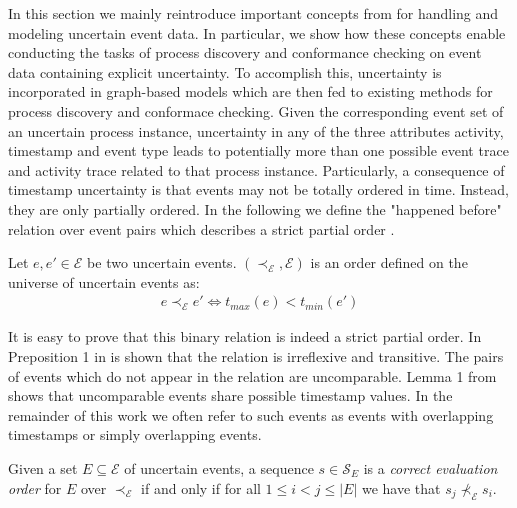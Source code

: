 In this section we mainly reintroduce important concepts from \citep{mining,discovery,efficient} for handling and modeling uncertain event data.
In particular, we show how these concepts enable conducting the tasks of process discovery and conformance checking on event data containing explicit uncertainty.
To accomplish this, uncertainty is incorporated in graph-based models which are then fed to existing methods for process discovery and conformace checking.
Given the corresponding event set of an uncertain process instance, uncertainty in any of the three attributes activity, timestamp and event type leads to potentially more than one possible event trace and activity trace related to that process instance.
Particularly, a consequence of timestamp uncertainty is that events may not be totally ordered in time.
Instead, they are only partially ordered.
In the following we define the "happened before" relation over event pairs which describes a strict partial order \cite{conformance}. 

\begin{definition}
Let $e, e' \in \mathcal{E}$ be two uncertain events.
$(\prec_{\mathcal{E}},\mathcal{E})$ is an order defined on the universe of uncertain events as:
\begin{align*}
e \prec_{\mathcal{E}} e' \Leftrightarrow t_{max}(e) < t_{min}(e')
\end{align*}
\end{definition}

It is easy to prove that this binary relation is indeed a strict partial order.
In Preposition 1 in \cite{conformance} is shown that the relation is irreflexive and transitive.
The pairs of events which do not appear in the relation are uncomparable.
Lemma 1 from \cite{conformance} shows that uncomparable events share possible timestamp values.
In the remainder of this work we often refer to such events as events with overlapping timestamps or simply overlapping events.

\begin{definition}
Given a set $E \subseteq \mathcal{E}$ of uncertain events, a sequence $s \in \mathcal{S}_E$ is a \emph{correct evaluation order} for $E$ over $\prec_{\mathcal{E}}$ if and only if for all $1 \leq i < j \leq |E|$ we have that $s_j \not \prec_{\mathcal{E}} s_i$. 
\end{definition}

